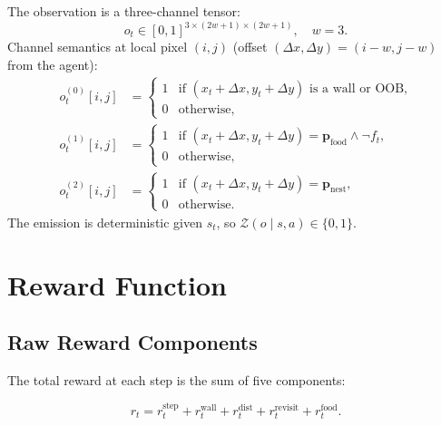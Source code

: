 \documentclass[11pt,a4paper]{article}
\newcommand{\cZ}{\mathcal{Z}}
\begin{document}
The observation is a three-channel tensor:
\begin{equation}
  o_t \in [0,1]^{3 \times (2w{+}1) \times (2w{+}1)},
  \quad w = 3.
\end{equation}
Channel semantics at local pixel $(i,j)$ (offset $(\Delta x, \Delta y) = (i-w, j-w)$
from the agent):
\begin{align}
  o_t^{(0)}[i,j] &=
  \begin{cases} 1 & \text{if }(x_t{+}\Delta x, y_t{+}\Delta y)\text{ is a wall or OOB,} \\ 0 & \text{otherwise,} \end{cases} \\[4pt]
  o_t^{(1)}[i,j] &=
  \begin{cases} 1 & \text{if }(x_t{+}\Delta x, y_t{+}\Delta y) = \mathbf{p}_{\text{food}} \land \lnot f_t, \\ 0 & \text{otherwise,} \end{cases} \\[4pt]
  o_t^{(2)}[i,j] &=
  \begin{cases} 1 & \text{if }(x_t{+}\Delta x, y_t{+}\Delta y) = \mathbf{p}_{\text{nest}}, \\ 0 & \text{otherwise.} \end{cases}
\end{align}
The emission is deterministic given $s_t$, so $\cZ(o \mid s, a) \in \{0,1\}$.

\section{Reward Function}

\subsection{Raw Reward Components}

The total reward at each step is the sum of five components:

\begin{equation}
  r_t = r_t^{\text{step}} + r_t^{\text{wall}} + r_t^{\text{dist}} + r_t^{\text{revisit}} + r_t^{\text{food}}.
  \label{eq:reward}
\end{equation}
\end{document}
